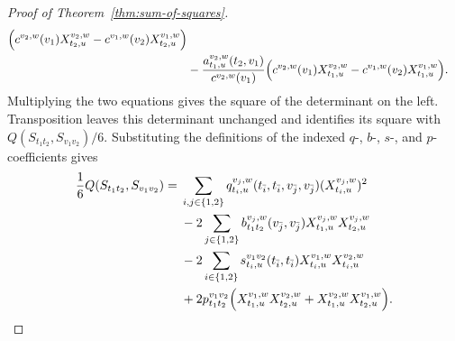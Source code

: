 \documentclass[12pt]{article}
\begin{document}
\begin{proof}[Proof of Theorem~\ref{thm:sum-of-squares}]
\begin{equation}
\begin{aligned}
\Bigl(c^{v_2,w}(v_1)X_{t_2,u}^{v_2,w}
-c^{v_1,w}(v_2)X_{t_2,u}^{v_1,w}\Bigr)                         \\
&-\frac{a_{t_1,u}^{v_2,w}(t_2,v_1)}{c^{v_2,w}(v_1)}
\Bigl(c^{v_2,w}(v_1)X_{t_1,u}^{v_2,w}
-c^{v_1,w}(v_2)X_{t_1,u}^{v_1,w}\Bigr).
\end{aligned}
\end{equation}
Multiplying the two equations gives the square of the determinant on the
left.  Transposition leaves this determinant unchanged and identifies its
square with $Q(S_{t_1t_2},S_{v_1v_2})/6$.  Substituting the definitions of the
indexed $q$-, $b$-, $s$-, and $p$-coefficients gives
\begin{align}
\frac16Q(S_{t_1t_2},S_{v_1v_2})
={}&\sum_{i,j\in\{1,2\}}
q_{t_i,u}^{v_j,w}(t_{\bar i},t_{\bar i},v_{\bar j},v_{\bar j})
(X_{t_i,u}^{v_j,w})^2                                         \notag\\
&-2\sum_{j\in\{1,2\}}
b_{t_1t_2}^{v_j,w}(v_{\bar j},v_{\bar j})
X_{t_1,u}^{v_j,w}X_{t_2,u}^{v_j,w}                             \notag\\
&-2\sum_{i\in\{1,2\}}
s_{t_i,u}^{v_1v_2}(t_{\bar i},t_{\bar i})
X_{t_i,u}^{v_1,w}X_{t_i,u}^{v_2,w}                             \notag\\
&+2p_{t_1t_2}^{v_1v_2}
\Bigl(X_{t_1,u}^{v_1,w}X_{t_2,u}^{v_2,w}
+X_{t_1,u}^{v_2,w}X_{t_2,u}^{v_1,w}\Bigr).             \label{eq:path-path}
\end{align}


\end{proof}
\end{document}
